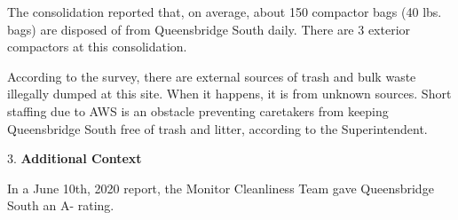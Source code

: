  

The consolidation reported that, on average, about 150 compactor bags (40 lbs. bags) are disposed of from Queensbridge South daily. There are 3 exterior compactors at this consolidation.

 

According to the survey, there are external sources of trash and bulk waste illegally dumped at this site. When it happens, it is from unknown sources. Short staffing due to AWS is an obstacle preventing caretakers from keeping Queensbridge South free of trash and litter, according to the Superintendent.

  

3. \textbf{Additional Context}  

In a June 10th, 2020 report, the Monitor Cleanliness Team gave Queensbridge South an A- rating.